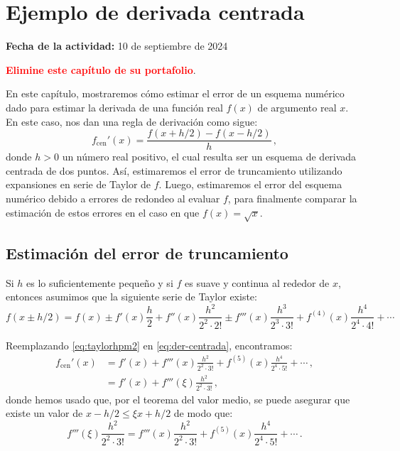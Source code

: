 \documentclass[../portafolio.tex]{subfiles}
\begin{document}
\chapter{Ejemplo de derivada centrada}
\label{ch:ejemplo-derivadas}
\hfill \textbf{Fecha de la actividad:} 10 de septiembre de 2024

\medskip

\textcolor{red}{\bf Elimine este capítulo de su portafolio}.

\medskip

En este capítulo, mostraremos cómo estimar el error de un esquema
numérico dado para estimar la derivada de una función real $f(x)$ de
argumento real $x$. En este caso, nos dan una regla de derivación como
sigue:
\begin{equation}
  \label{eq:der-centrada}
  f_\text{cen}'(x) = \frac{f(x+h/2) - f(x-h/2)}{h}\,,
\end{equation}
%
donde $h>0$ un número real positivo, el cual resulta ser un esquema de
derivada centrada de dos puntos. Así, estimaremos el error de
truncamiento utilizando expansiones en serie de Taylor de $f$. Luego,
estimaremos el error del esquema numérico debido a errores de redondeo
al evaluar $f$, para finalmente comparar la estimación de estos
errores en el caso en que $f(x)=\sqrt{x}$.

\medskip

\section{Estimación del error de truncamiento}
Si $h$ es lo suficientemente pequeño y si $f$ es suave y continua al rededor de $x$, entonces asumimos que la siguiente serie de Taylor existe:
\begin{equation}
  \label{eq:taylorhpm2}
  f(x\pm h/2) =
  f(x) \pm f'(x) \frac{h}{2} + f''(x) \frac{h^2}{2^2 \cdot 2!}
  \pm f'''(x) \frac{h^3}{2^3\cdot 3!}
  +  f^{(4)}(x) \frac{h^4}{2^4\cdot 4!} + \cdots
\end{equation}

Reemplazando \eqref{eq:taylorhpm2} en \eqref{eq:der-centrada}, encontramos:
\begin{align}
  \label{eq:deriv-trunc}
  f_\text{cen}'(x)
  &=
  f'(x) + f'''(x) \frac{h^2}{2^2\cdot 3!}
  +
    f^{(5)}(x) \frac{h^4}{2^4\cdot 5!} + \cdots \,, \nonumber \\
  &=
    f'(x) + f'''(\xi) \frac{h^2}{2^2\cdot 3!} \,,
\end{align}
%
donde hemos usado que, por el teorema del valor medio, se puede asegurar que existe un valor de $x-h/2\leq \xi x+h/2$ de modo que:
\begin{equation}
  \label{eq:trunca}
  f'''(\xi) \frac{h^2}{2^2\cdot 3!}
  =
  f'''(x) \frac{h^2}{2^2\cdot 3!}
  +
  f^{(5)}(x) \frac{h^4}{2^4\cdot 5!} + \cdots \,.
\end{equation}
\end{document}
